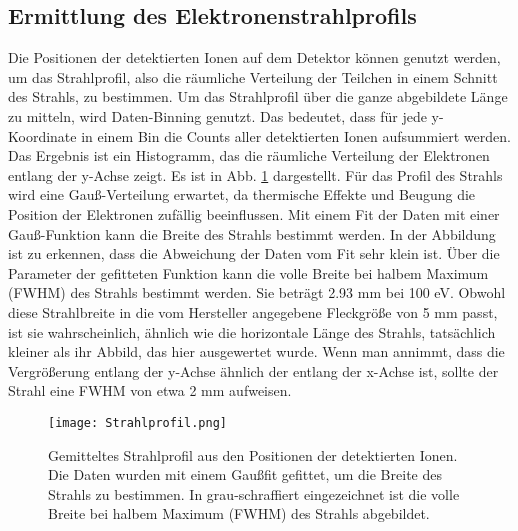\subsection{Ermittlung des Elektronenstrahlprofils}
\label{sec:profil}
Die Positionen der detektierten Ionen auf dem Detektor können genutzt werden, um das Strahlprofil, also die räumliche Verteilung der Teilchen in einem Schnitt des Strahls, zu bestimmen. Um das Strahlprofil über die ganze abgebildete Länge zu mitteln, wird Daten-Binning genutzt. Das bedeutet, dass für jede y-Koordinate in einem Bin die Counts aller detektierten Ionen aufsummiert werden. Das Ergebnis ist ein Histogramm, das die räumliche Verteilung der Elektronen entlang der y-Achse zeigt. Es ist in Abb. \ref{fig:Strahlprofil} dargestellt. Für das Profil des Strahls wird eine Gauß-Verteilung erwartet, da thermische Effekte und Beugung die Position der Elektronen zufällig beeinflussen. Mit einem Fit der Daten mit einer Gauß-Funktion kann die Breite des Strahls bestimmt werden. In der Abbildung ist zu erkennen, dass die Abweichung der Daten vom Fit sehr klein ist. Über die Parameter der gefitteten Funktion kann die volle Breite bei halbem Maximum (FWHM) des Strahls bestimmt werden. Sie beträgt 2.93 mm bei 100 eV. Obwohl diese Strahlbreite in die vom Hersteller angegebene Fleckgröße von 5 mm passt, ist sie wahrscheinlich, ähnlich wie die horizontale Länge des Strahls, tatsächlich kleiner als ihr Abbild, das hier ausgewertet wurde. Wenn man annimmt, dass die Vergrößerung entlang der y-Achse ähnlich der entlang der x-Achse ist, sollte der Strahl eine FWHM von etwa 2 mm aufweisen.

\begin{figure}
    \centering
    \texttt{[image: Strahlprofil.png]}
    \caption[Gemitteltes Strahlprofil]{Gemitteltes Strahlprofil aus den Positionen der detektierten Ionen. Die Daten wurden mit einem Gaußfit gefittet, um die Breite des Strahls zu bestimmen. In grau-schraffiert eingezeichnet ist die volle Breite bei halbem Maximum (FWHM) des Strahls abgebildet.}
    \label{fig:Strahlprofil} 
\end{figure}